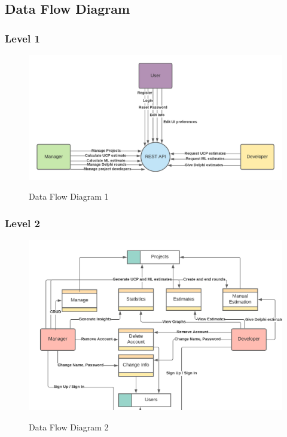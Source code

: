 \subsection{Data Flow Diagram}

\subsubsection{Level 1}

\begin{figure}[H]
    \centering
    \caption{Data Flow Diagram 1}
    \includegraphics[scale=0.7]{./diagrams/data-flow/df-1.png}
    \label{fig:df-diag-1}
\end{figure}


\subsubsection{Level 2}
\begin{figure}[H]
    \centering
    \caption{Data Flow Diagram 2}
    \includegraphics[scale=0.7]{./diagrams/data-flow/df-2.png}
    \label{fig:df-diag-2}
\end{figure}